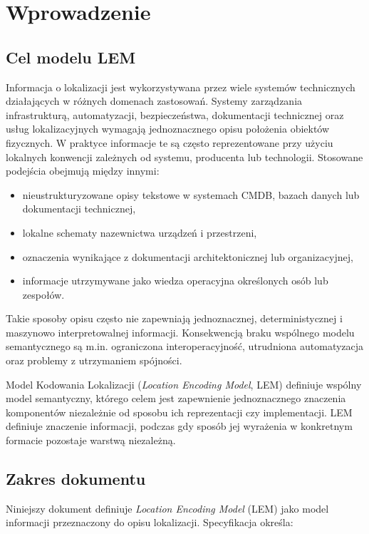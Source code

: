 
\chapter{Wprowadzenie}
\label{chap:wprowadzenie}

\section{Cel modelu LEM}
\label{sec:cel-lem}
Informacja o lokalizacji jest wykorzystywana przez wiele systemów technicznych działających w różnych domenach zastosowań. Systemy zarządzania infrastrukturą, automatyzacji, bezpieczeństwa, dokumentacji technicznej oraz usług lokalizacyjnych wymagają jednoznacznego opisu położenia obiektów fizycznych. W praktyce informacje te są często reprezentowane przy użyciu lokalnych konwencji zależnych od systemu, producenta lub technologii. Stosowane podejścia obejmują między innymi:

\begin{itemize}
    \item nieustrukturyzowane opisy tekstowe w systemach CMDB, bazach danych lub dokumentacji technicznej,
    \item lokalne schematy nazewnictwa urządzeń i przestrzeni,
    \item oznaczenia wynikające z dokumentacji architektonicznej lub organizacyjnej,
    \item informacje utrzymywane jako wiedza operacyjna określonych osób lub zespołów.
\end{itemize}

Takie sposoby opisu często nie zapewniają jednoznacznej, deterministycznej i maszynowo interpretowalnej informacji. Konsekwencją braku wspólnego modelu semantycznego są m.in. ograniczona interoperacyjność, utrudniona automatyzacja oraz problemy z utrzymaniem spójności.

Model Kodowania Lokalizacji (\textit{Location Encoding Model}, LEM) definiuje wspólny model semantyczny, którego celem jest zapewnienie jednoznacznego znaczenia komponentów niezależnie od sposobu ich reprezentacji czy implementacji. LEM definiuje znaczenie informacji, podczas gdy sposób jej wyrażenia w konkretnym formacie pozostaje warstwą niezależną.

\section{Zakres dokumentu}
\label{sec:zakres}
Niniejszy dokument definiuje \textit{Location Encoding Model} (LEM) jako model informacji przeznaczony do opisu lokalizacji. Specyfikacja określa:

